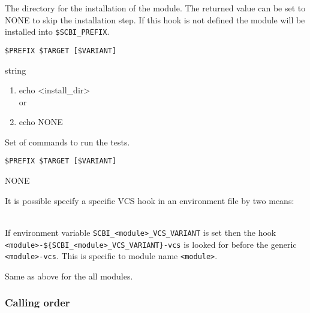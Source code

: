 \documentclass[a4paper,12pt,twoside]{article}
\newcommand{\code}[1]{\texttt{#1}}
\begin{document}
\begin{description}[font=\large\texttt]
	\item[<module>-prefix] The directory for the installation of the module. The returned value can be set to NONE to skip the installation step. If this hook is not defined the module will be installed into \code{\$SCBI\_PREFIX}.
	\label{global-install}
	\begin{description}[font=\textit,style=standard]
		\item[parameter] \tabto{2cm} \code{\$PREFIX \$TARGET [\$VARIANT]}
		\item[return] \tabto{2cm} string
		\begin{enumerate}
			\item echo <install\_dir>
			\\ or
			\item echo NONE
		\end{enumerate}
	\end{description}

	\item[<module>-tests] Set of commands to run the tests.
	\begin{description}[font=\textit,style=standard]
		\item[parameter] \tabto{2cm} \code{\$PREFIX \$TARGET [\$VARIANT]}
		\item[return] \tabto{2cm} NONE
	\end{description}

        It is possible specify a specific VCS hook in an environment file by two means:

        \begin{description}[style=standard]
                \item[\code{SCBI\_<module>\_VCS\_VARIANT}] \hfill \\
                 If environment variable \code{SCBI\_<module>\_VCS\_VARIANT} is set then the hook \\ \code{<module>-\$\{SCBI\_<module>\_VCS\_VARIANT\}-vcs} is looked for before the generic \code{<module>-vcs}. This is specific to module name \code{<module>}.

                \item[\code{SCBI\_VCS\_VARIANT}] Same as above for the all modules.
        \end{description}

\end{description}

\subsubsection{Calling order}
\end{document}
